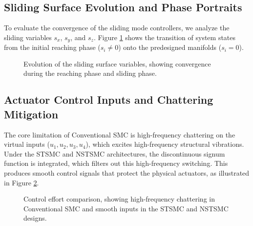 \subsection{Sliding Surface Evolution and Phase Portraits}
To evaluate the convergence of the sliding mode controllers, we analyze the sliding variables $s_x$, $s_y$, and $s_z$. Figure \ref{fig:sliding_surfaces} shows the transition of system states from the initial reaching phase ($s_i \neq 0$) onto the predesigned manifolds ($s_i = 0$).

\begin{figure}[h!]
\centering
{}
\caption{Evolution of the sliding surface variables, showing convergence during the reaching phase and sliding phase.}
\label{fig:sliding_surfaces}
\end{figure}

\subsection{Actuator Control Inputs and Chattering Mitigation}
The core limitation of Conventional SMC is high-frequency chattering on the virtual inputs ($u_1, u_2, u_3, u_4$), which excites high-frequency structural vibrations. Under the STSMC and NSTSMC architectures, the discontinuous signum function is integrated, which filters out this high-frequency switching. This produces smooth control signals that protect the physical actuators, as illustrated in Figure \ref{fig:control_inputs}.

\begin{figure}[h!]
\centering
{}
\caption{Control effort comparison, showing high-frequency chattering in Conventional SMC and smooth inputs in the STSMC and NSTSMC designs.}
\label{fig:control_inputs}
\end{figure}

